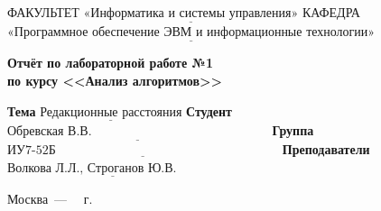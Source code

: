 \begin{titlepage}
	
	\noindent ФАКУЛЬТЕТ $\underline{\text{«Информатика и системы управления»}}$ \newline\newline
	\noindent КАФЕДРА $\underline{\text{«Программное обеспечение ЭВМ и информационные технологии»}}$\newline\newline\newline\newline\newline\newline\newline
	
	\vspace{\baselineskip}

	\begin{center}
		\noindent\begin{minipage}{0.71\textwidth}\centering
			\Large\textbf{Отчёт по лабораторной работе №1\\по курсу <<Анализ алгоритмов>>}\newline\newline
		\end{minipage}
	\end{center}

	\noindent\textbf{Тема} $\underline{\text{Редакционные расстояния}}$\newline\newline\newline
	\noindent\textbf{Студент} $\underline{\text{Обревская В.В.~~~~~~~~~~~~~~~~~~~~~~~~~~~~~~~~~~~~~~~~~~}}$\newline\newline
	\noindent\textbf{Группа} $\underline{\text{ИУ7-52Б~~~~~~~~~~~~~~~~~~~~~~~~~~~~~~~~~~~~~~~~~~~~~~~~~~~~~}}$\newline\newline
	\noindent\textbf{Преподаватели} $\underline{\text{Волкова Л.Л., Строганов Ю.В.~~~~~~~~~~}}$\newline
	
	\begin{center}
		\vfill
		Москва~---~\the\year
		~г.
	\end{center}
 \restoregeometry
\end{titlepage}